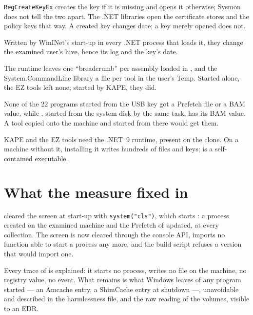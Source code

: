 \documentclass[11pt,a4paper,oneside]{report}
\begin{document}
\begin{description}[style=nextline,leftmargin=1em]
  \item[Open-or-create] \texttt{RegCreateKeyEx} creates the key if it is missing
        and opens it otherwise; Sysmon does not tell the two apart. The .NET
        libraries open the certificate stores and the policy keys that way. A
        created key changes date; a key merely opened does not.
  \item[The \texttt{ZoneMap} values] Written by WinINet's start-up in every .NET
        process that loads it, they change the examined user's
         hive, hence its log and the key's date.
  \item[The .NET files] The runtime leaves one ``breadcrumb'' per assembly
        loaded in , and the System.CommandLine library a
        file per tool in the user's Temp. Started alone, the EZ tools left none;
        started by KAPE, they did.
  \item[Prefetch and BAM] None of the 22 programs started from the USB key got
        a Prefetch file or a BAM value, while , started from the
        system disk by the same task, has its BAM value. A tool copied onto the
        machine and started from there would get them.
  \item[The .NET prerequisite] KAPE and the EZ tools need the .NET~9 runtime,
        present on the clone. On a machine without it, installing it writes
        hundreds of files and keys; \wac{} is a self-contained executable.
\end{description}

\section{What the measure fixed in \wac{}}

\wac{} cleared the screen at start-up with \texttt{system("cls")}, which starts
: a process created on the examined machine and the Prefetch of
 updated, at every collection. The screen is now cleared
through the console API, \wac{} imports no function able to start a process any
more, and the build script refuses a version that would import one.

\begin{note}
Every trace of \wac{} is explained: it starts no process, writes no file on the
machine, no registry value, no event. What remains is what Windows leaves of any
program started --- an Amcache entry, a ShimCache entry at shutdown ---,
unavoidable and described in the harmlessness file, and the raw reading of the
volumes, visible to an EDR.
\end{note}
\end{document}
